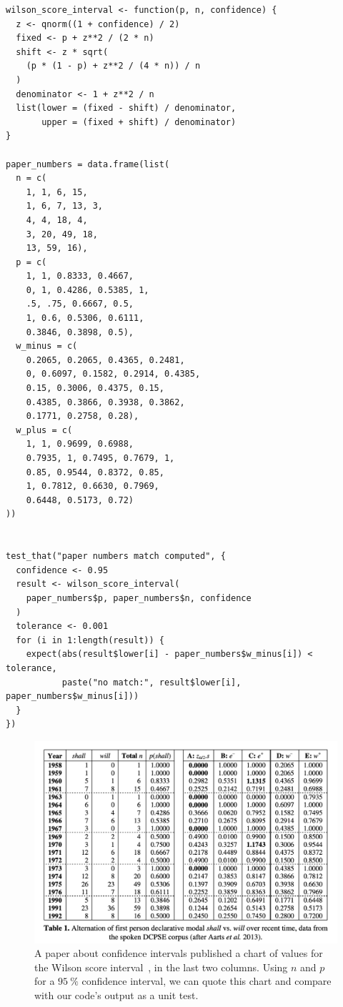 \documentclass[fleqn,10pt]{olplainarticle}
\begin{document}
\begin{lstlisting}
wilson_score_interval <- function(p, n, confidence) {
  z <- qnorm((1 + confidence) / 2)
  fixed <- p + z**2 / (2 * n)
  shift <- z * sqrt(
    (p * (1 - p) + z**2 / (4 * n)) / n
  )
  denominator <- 1 + z**2 / n
  list(lower = (fixed - shift) / denominator,
       upper = (fixed + shift) / denominator)
}

paper_numbers = data.frame(list(
  n = c(
    1, 1, 6, 15,
    1, 6, 7, 13, 3,
    4, 4, 18, 4,
    3, 20, 49, 18,
    13, 59, 16),
  p = c(
    1, 1, 0.8333, 0.4667,
    0, 1, 0.4286, 0.5385, 1,
    .5, .75, 0.6667, 0.5,
    1, 0.6, 0.5306, 0.6111,
    0.3846, 0.3898, 0.5),
  w_minus = c(
    0.2065, 0.2065, 0.4365, 0.2481,
    0, 0.6097, 0.1582, 0.2914, 0.4385,
    0.15, 0.3006, 0.4375, 0.15,
    0.4385, 0.3866, 0.3938, 0.3862,
    0.1771, 0.2758, 0.28),
  w_plus = c(
    1, 1, 0.9699, 0.6988,
    0.7935, 1, 0.7495, 0.7679, 1,
    0.85, 0.9544, 0.8372, 0.85,
    1, 0.7812, 0.6630, 0.7969,
    0.6448, 0.5173, 0.72)
))


test_that("paper numbers match computed", {
  confidence <- 0.95
  result <- wilson_score_interval(
    paper_numbers$p, paper_numbers$n, confidence
  )
  tolerance <- 0.001
  for (i in 1:length(result)) {
    expect(abs(result$lower[i] - paper_numbers$w_minus[i]) < tolerance,
           paste("no match:", result$lower[i], paper_numbers$w_minus[i]))
  }
})
\end{lstlisting}

\begin{figure}
    \centering
    \includegraphics[scale=0.4]{wilson_chart.pdf}
    \caption{A paper about confidence intervals published a chart of values for
    the Wilson score interval~\citep{wallis2013binomial}, in the last two columns. Using $n$ and $p$
    for a $95\:\%$ confidence interval, we can quote this chart and compare with
    our code's output as a unit test.}
    \label{fig:wilson_chart}
\end{figure}
\end{document}
